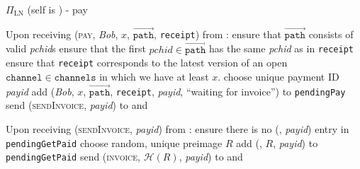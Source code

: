\begin{protocolbox}{$\Pi_{\mathrm{LN}}$ (self is \alice) - pay}
  \label{alg:protocol:pay}
  \begin{algorithmic}[1]
    \State {}
    \State Upon receiving (\textsc{pay}, \textit{Bob}, $x$,
    $\overrightarrow{\mathtt{path}}$, \texttt{receipt}) from \environment:
    \Indent
      \State ensure that $\overrightarrow{\mathtt{path}}$ consists of valid
      \textit{pchid}s
      \State ensure that the first $\mathit{pchid} \in
      \overrightarrow{\mathtt{path}}$ has the same \textit{pchid} as in
      \texttt{receipt}
      \State ensure that \texttt{receipt} corresponds to the latest version of
      an open $\mathtt{channel} \in \mathtt{channels}$ in which we have at least
      $x$.
      \State choose unique payment ID \textit{payid} 
      \State add (\textit{Bob}, $x$, $\overrightarrow{\mathtt{path}}$,
      \texttt{receipt}, \textit{payid}, ``waiting for invoice'') to
      \texttt{pendingPay}
      \State send (\textsc{sendInvoice}, \textit{payid}) to \bob{} and
      \adversary
    \EndIndent
    \State

    \State Upon receiving (\textsc{sendInvoice}, \textit{payid}) from \bob:
    \Indent
      \State ensure there is no (\bob, \textit{payid}) entry in
      \texttt{pendingGetPaid}
      \State choose random, unique preimage $R$
      \State add (\bob, $R$, \textit{payid}) to \texttt{pendingGetPaid}
      \State send (\textsc{invoice}, $\mathcal{H}\left(R\right)$,
      \textit{payid}) to \bob{} and \adversary
    \EndIndent
    \State


\end{algorithmic}
\end{protocolbox}
